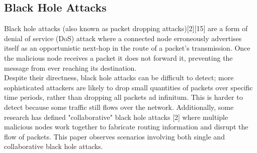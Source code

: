 \documentclass{article}
\begin{document}
\subsection{Black Hole Attacks}
Black hole attacks (also known as packet dropping attacks)[2][15] are a form of denial of service (DoS) attack where a connected node erroneously advertises itself as an opportunistic next-hop in the route of a packet's transmission. Once the malicious node receives a packet it does not forward it, preventing the message from ever reaching its destination.\\
\newline Despite their directness, black hole attacks can be difficult to detect; more sophisticated attackers are likely to drop small quantities of packets over specific time periods, rather than dropping all packets ad infinitum. This is harder to detect because some traffic still flows over the network. Additionally, some research has defined "collaborative" black hole attacks [2] where multiple malicious nodes work together to fabricate routing information and disrupt the flow of packets.
This paper observes scenarios involving both single and collaborative black hole attacks.
\end{document}
